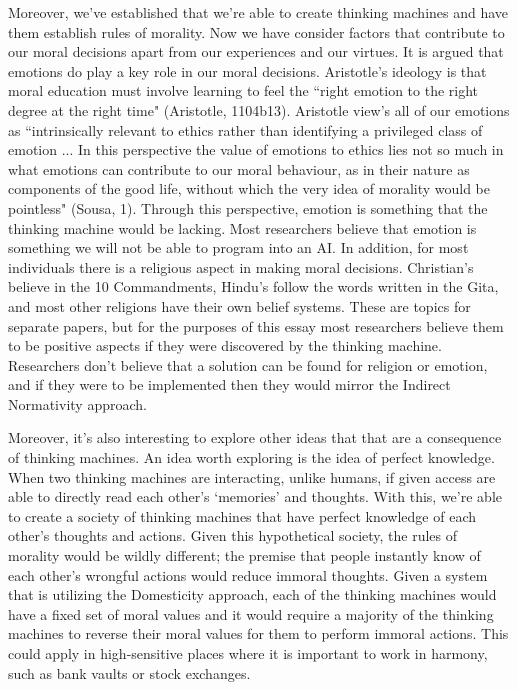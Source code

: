\documentclass[11pt, oneside]{article}
\begin{document}
\par Moreover, we've established that we're able to create thinking machines and have them establish rules of morality. Now we have consider factors that contribute to our moral decisions apart from our experiences and our virtues. It is argued that emotions do play a key role in our moral decisions. Aristotle's ideology is that moral education must involve learning to feel the ``right emotion to the right degree at the right time" (Aristotle, 1104b13). Aristotle view's all of our emotions as ``intrinsically relevant to ethics rather than identifying a privileged class of emotion ... In this perspective the value of emotions to ethics lies not so much in what emotions can contribute to our moral behaviour, as in their nature as components of the good life, without which the very idea of morality would be pointless" (Sousa, 1). Through this perspective, emotion is something that the thinking machine would be lacking. Most researchers believe that emotion is something we will not be able to program into an AI. In addition, for most individuals there is a religious aspect in making moral decisions. Christian's believe in the 10 Commandments, Hindu's follow the words written in the Gita, and most other religions have their own belief systems. These are topics for separate papers, but for the purposes of this essay most researchers believe them to be positive aspects if they were discovered by the thinking machine. Researchers don't believe that a solution can be found for religion or emotion, and if they were to be implemented then they would mirror the Indirect Normativity approach.

\par 
Moreover, it's also interesting to explore other ideas that that are a consequence of thinking machines. 
An idea worth exploring is the idea of perfect knowledge. When two thinking machines are interacting, unlike humans, if given access are able to directly read each other's `memories' and thoughts. With this, we're able to create a society of thinking machines that have perfect knowledge of each other's thoughts and actions. 
Given this hypothetical society, the rules of morality would be wildly different; the premise that people instantly know of each other's wrongful actions would reduce immoral thoughts. Given a system that is utilizing the Domesticity approach, each of the thinking machines would have a fixed set of moral values and it would require a majority of the thinking machines to reverse their moral values for them to perform immoral actions. 
This could apply in high-sensitive places where it is important to work in harmony, such as bank vaults or stock exchanges. 
\end{document}
